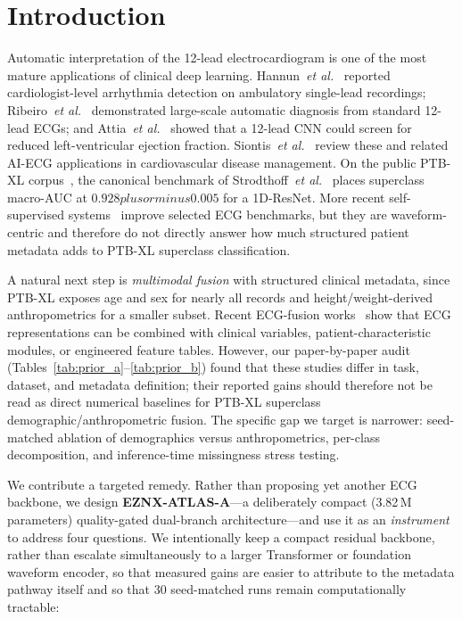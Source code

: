 \documentclass[mathematics,article,submit,pdftex]{Definitions/mdpi}
\def\pm{plus or minus }%
\begin{document}
\section{Introduction}\label{sec:intro}

Automatic interpretation of the 12-lead electrocardiogram is one of the most mature applications of clinical deep learning. Hannun~\textit{et al.}~\cite{Hannun2019} reported cardiologist-level arrhythmia detection on ambulatory single-lead recordings; Ribeiro~\textit{et al.}~\cite{Ribeiro2020} demonstrated large-scale automatic diagnosis from standard 12-lead ECGs; and Attia~\textit{et al.}~\cite{Attia2019LV} showed that a 12-lead CNN could screen for reduced left-ventricular ejection fraction. Siontis~\textit{et al.}~\cite{Siontis2021} review these and related AI-ECG applications in cardiovascular disease management. On the public PTB-XL corpus~\cite{Wagner2020}, the canonical benchmark of Strodthoff~\textit{et al.}~\cite{Strodthoff2021} places superclass macro-AUC at $0.928 \pm 0.005$ for a 1D-ResNet. More recent self-supervised systems~\cite{Mehari2022, Weimann2025, Coppola2024} improve selected ECG benchmarks, but they are waveform-centric and therefore do not directly answer how much structured patient metadata adds to PTB-XL superclass classification.

A natural next step is \emph{multimodal fusion} with structured clinical metadata, since PTB-XL exposes age and sex for nearly all records and height/weight-derived anthropometrics for a smaller subset. Recent ECG-fusion works~\cite{Qiu2024, Srivastava2025, Atwa2025, Holloway2026} show that ECG representations can be combined with clinical variables, patient-characteristic modules, or engineered feature tables. However, our paper-by-paper audit (Tables~\ref{tab:prior_a}--\ref{tab:prior_b}) found that these studies differ in task, dataset, and metadata definition; their reported gains should therefore not be read as direct numerical baselines for PTB-XL superclass demographic/anthropometric fusion. The specific gap we target is narrower: seed-matched ablation of demographics versus anthropometrics, per-class decomposition, and inference-time missingness stress testing.

We contribute a targeted remedy. Rather than proposing yet another ECG backbone, we design \textbf{EZNX-ATLAS-A}---a deliberately compact (3.82\,M parameters) quality-gated dual-branch architecture---and use it as an \emph{instrument} to address four questions. We intentionally keep a compact residual backbone, rather than escalate simultaneously to a larger Transformer or foundation waveform encoder, so that measured gains are easier to attribute to the metadata pathway itself and so that 30 seed-matched runs remain computationally tractable:
\end{document}

